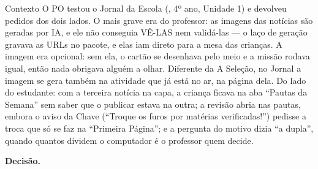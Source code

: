 \begin{especificacao}{Contexto}
O PO testou o Jornal da Escola (, 4º ano, Unidade 1) e devolveu
pedidos dos dois lados. O mais grave era do professor: as imagens das notícias
são geradas por IA, e ele não conseguia VÊ-LAS nem validá-las --- o laço de
geração gravava as URLs no pacote, e elas iam direto para a mesa das crianças.
A imagem era opcional: sem ela, o cartão se desenhava pelo meio e a missão
rodava igual, então nada obrigava alguém a olhar. Diferente da A Seleção, no
Jornal a imagem se gera também na atividade que já está no ar, na página dela.
Do lado do estudante: com a terceira notícia na capa, a criança ficava na aba
\enquote{Pautas da Semana} sem saber que o publicar estava na outra; a revisão
abria nas pautas, embora o aviso da Chave (\enquote{Troque os furos por
matérias verificadas!}) pedisse a troca que só se faz na \enquote{Primeira
Página}; e a pergunta do motivo dizia \enquote{a dupla}, quando quantos dividem
o computador é o professor quem decide.
\end{especificacao}

\textbf{Decisão.}

